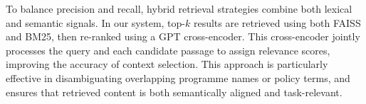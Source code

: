\documentclass[runningheads]{llncs}
\begin{document}
To balance precision and recall, hybrid retrieval strategies combine both lexical and semantic signals. In our system, top-$k$ results are retrieved using both FAISS and BM25, then re-ranked using a GPT cross-encoder. This cross-encoder jointly processes the query and each candidate passage to assign relevance scores, improving the accuracy of context selection. This approach is particularly effective in disambiguating overlapping programme names or policy terms, and ensures that retrieved content is both semantically aligned and task-relevant.

\end{document}

